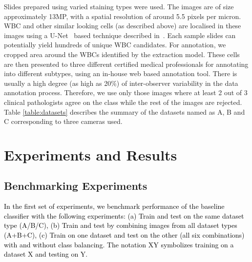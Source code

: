 \documentclass[journal,twoside,web]{IEEEtran}
\renewcommand{\textrightarrow}{}
\newcommand{\bb}{\textcolor{black}}
\begin{document}
Slides prepared using varied staining types were used.
The images are of size approximately 13MP, with a spatial resolution of around 5.5 pixels per micron.
WBC and other similar looking cells (as described above) are localised in these images using a U-Net~\cite{unet} based technique described in~\cite{shonit}.
Each sample slides can potentially yield hundreds of unique WBC candidates. For annotation, we cropped  area around the WBCs identified by the extraction model.
These cells are then presented to three different certified medical professionals for annotating into different subtypes, using an in-house web based annotation tool.
There is usually a high degree (as high as 20\%) of inter-observer variability in the data annotation process.
Therefore, we use only those images where at least 2 out of 3 clinical pathologists agree on the class while the rest of the images are rejected. Table \ref{table:datasets} describes the summary of the datasets named as A, B and C corresponding to three cameras used. 
\section{Experiments and Results}
\subsection{Benchmarking Experiments}
\bb{In the first set of experiments, we benchmark performance of the baseline classifier with the following experiments: (a) Train and test on the same dataset type (A/B/C), (b) Train and test by combining images from all dataset types (A+B+C), (c) Train on one dataset and test on the other (all six combinations) with and without class balancing. The notation {X\textrightarrow Y} symbolizes training on a dataset X and testing on Y.}
\end{document}
